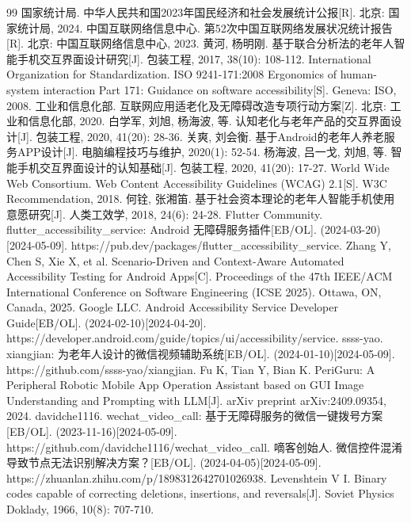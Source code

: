 \documentclass[12pt,AutoFakeBold]{xuptThesis}
\begin{document}
\clearpage
\fontsize{11.5}{16}\songti\selectfont
\setlength{\bibsep}{0.3ex}
\setlength{\labelsep}{0.25em}
\begin{thebibliography}{99}
 国家统计局. 中华人民共和国2023年国民经济和社会发展统计公报[R]. 北京: 国家统计局, 2024.
 中国互联网络信息中心. 第52次中国互联网络发展状况统计报告[R]. 北京: 中国互联网络信息中心, 2023.
 黄河, 杨明刚. 基于联合分析法的老年人智能手机交互界面设计研究[J]. 包装工程, 2017, 38(10): 108-112.
 International Organization for Standardization. ISO 9241-171:2008 Ergonomics of human-system interaction Part 171: Guidance on software accessibility[S]. Geneva: ISO, 2008.
 工业和信息化部. 互联网应用适老化及无障碍改造专项行动方案[Z]. 北京: 工业和信息化部, 2020.
 白学军, 刘旭, 杨海波, 等. 认知老化与老年产品的交互界面设计[J]. 包装工程, 2020, 41(20): 28-36.
 关爽, 刘会衡. 基于Android的老年人养老服务APP设计[J]. 电脑编程技巧与维护, 2020(1): 52-54.
 杨海波, 吕一戈, 刘旭, 等. 智能手机交互界面设计的认知基础[J]. 包装工程, 2020, 41(20): 17-27.
 World Wide Web Consortium. Web Content Accessibility Guidelines (WCAG) 2.1[S]. W3C Recommendation, 2018.
 何铨, 张湘笛. 基于社会资本理论的老年人智能手机使用意愿研究[J]. 人类工效学, 2018, 24(6): 24-28.
 Flutter Community. flutter\_accessibility\_service: Android 无障碍服务插件[EB/OL]. (2024-03-20)[2024-05-09]. https://pub.dev/packages/flutter\_accessibility\_service.
 Zhang Y, Chen S, Xie X, et al. Scenario-Driven and Context-Aware Automated Accessibility Testing for Android Apps[C]. Proceedings of the 47th IEEE/ACM International Conference on Software Engineering (ICSE 2025). Ottawa, ON, Canada, 2025.
 Google LLC. Android Accessibility Service Developer Guide[EB/OL]. (2024-02-10)[2024-04-20]. https://developer.android.com/guide/topics/ui/accessibility/service.
 ssss-yao. xiangjian: 为老年人设计的微信视频辅助系统[EB/OL]. (2024-01-10)[2024-05-09]. https://github.com/ssss-yao/xiangjian.
 Fu K, Tian Y, Bian K. PeriGuru: A Peripheral Robotic Mobile App Operation Assistant based on GUI Image Understanding and Prompting with LLM[J]. arXiv preprint arXiv:2409.09354, 2024.
 davidche1116. wechat\_video\_call: 基于无障碍服务的微信一键拨号方案[EB/OL]. (2023-11-16)[2024-05-09]. https://github.com/davidche1116/wechat\_video\_call.
 嘀客创始人. 微信控件混淆导致节点无法识别解决方案？[EB/OL]. (2024-04-05)[2024-05-09]. https://zhuanlan.zhihu.com/p/1898312642701026938.
 Levenshtein V I. Binary codes capable of correcting deletions, insertions, and reversals[J]. Soviet Physics Doklady, 1966, 10(8): 707-710.

\end{thebibliography}
\end{document}
